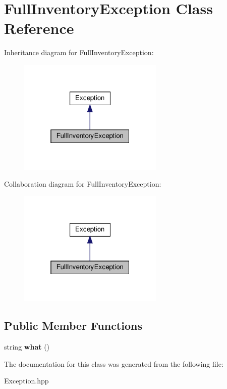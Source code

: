 \hypertarget{classFullInventoryException}{}\section{Full\+Inventory\+Exception Class Reference}
\label{classFullInventoryException}


Inheritance diagram for Full\+Inventory\+Exception\+:
\nopagebreak
\begin{figure}[H]
\begin{center}
\leavevmode
\includegraphics[width=196pt]{classFullInventoryException__inherit__graph}
\end{center}
\end{figure}


Collaboration diagram for Full\+Inventory\+Exception\+:
\nopagebreak
\begin{figure}[H]
\begin{center}
\leavevmode
\includegraphics[width=196pt]{classFullInventoryException__coll__graph}
\end{center}
\end{figure}
\subsection*{Public Member Functions}
\begin{DoxyCompactItemize}
\item 
\mbox{\label{classFullInventoryException_ac3bba389ec79cd23c88c22084f1c4548}} 
string {\bfseries what} ()
\end{DoxyCompactItemize}


The documentation for this class was generated from the following file\+:\begin{DoxyCompactItemize}
\item 
Exception.\+hpp\end{DoxyCompactItemize}
